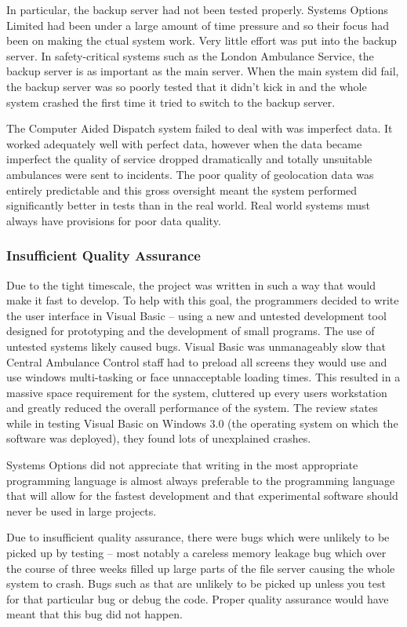 \documentclass[10pt,\jkfside,a4paper]{article}
\begin{document}
\begin{enumerate}
\begin{enumerate}
\begin{enumerate}[label=(\roman*)]
In particular, the backup server had not been tested properly. Systems Options Limited had been under a 
large amount of time pressure and so their focus had been on making the ctual system work. Very little 
effort was put into the backup server. In safety-critical systems such as the London Ambulance Service, 
the backup server is as important as the main server. When the main system did fail, the 
backup server was so poorly tested that it didn't kick in and the whole system crashed the first 
time it tried to switch to the backup server.

The Computer Aided Dispatch system failed to deal with was imperfect data. It worked adequately well 
with perfect data, however when the data became imperfect the quality of service dropped dramatically and 
totally unsuitable ambulances were sent to incidents. The poor quality of geolocation data was 
entirely predictable and this gross oversight meant the system performed significantly better in tests 
than in the real world. Real world systems must always have provisions for poor data quality.

\subsubsection*{Insufficient Quality Assurance}

Due to the tight timescale, the project was written in such a way that would make it fast to develop. 
To help with this goal, the programmers decided to write the user interface in Visual Basic -- using a 
new and untested development tool designed for prototyping and the development of small programs. The 
use of untested systems likely caused bugs. Visual Basic was unmanageably slow that Central Ambulance Control 
staff had to preload all screens they would use and use windows multi-tasking or face unnacceptable 
loading times. This resulted in a massive space requirement for the system, cluttered up every users workstation 
and greatly reduced the overall performance of the system. The review states while in testing Visual Basic 
on Windows 3.0 (the operating system on which the software was deployed), they found lots of unexplained 
crashes.

Systems Options did not appreciate that writing in the most appropriate programming language is almost 
always preferable to the programming language that will allow for the fastest development and that 
experimental software should never be used in large projects.

Due to insufficient quality assurance, there were bugs which were unlikely to be picked up by testing -- most 
notably a careless memory leakage bug which over the course of three weeks filled up large parts of the 
file server causing the whole system to crash. Bugs such as that are unlikely to be picked up unless 
you test for that particular bug or debug the code. Proper quality assurance would have meant that 
this bug did not happen.


\end{enumerate}
\end{enumerate}
\end{enumerate}
\end{document}
